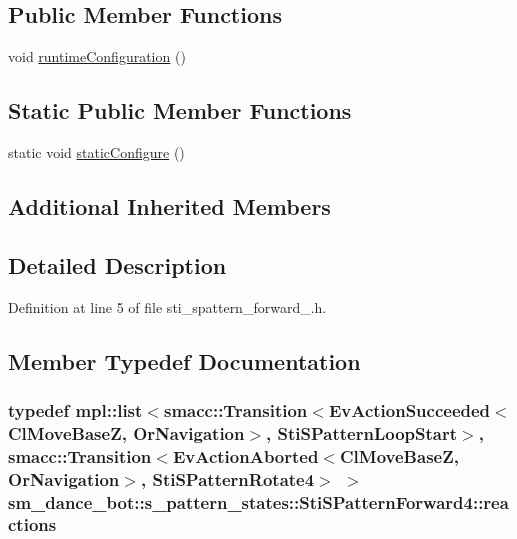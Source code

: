 \subsection*{Public Member Functions}
\begin{DoxyCompactItemize}
\item 
void \hyperlink{structsm__dance__bot_1_1s__pattern__states_1_1StiSPatternForward4_a1926043b5d5792ec4fed0e6911523268}{runtime\+Configuration} ()
\end{DoxyCompactItemize}
\subsection*{Static Public Member Functions}
\begin{DoxyCompactItemize}
\item 
static void \hyperlink{structsm__dance__bot_1_1s__pattern__states_1_1StiSPatternForward4_a387e35cd74525e1c124639f4452dbb6b}{static\+Configure} ()
\end{DoxyCompactItemize}
\subsection*{Additional Inherited Members}


\subsection{Detailed Description}


Definition at line 5 of file sti\+\_\+spattern\+\_\+forward\+\_.\+h.



\subsection{Member Typedef Documentation}
\subsubsection[{\texorpdfstring{reactions}{reactions}}]{\setlength{\rightskip}{0pt plus 5cm}typedef mpl\+::list$<${\bf smacc\+::\+Transition}$<$Ev\+Action\+Succeeded$<${\bf Cl\+Move\+BaseZ}, {\bf Or\+Navigation}$>$, {\bf Sti\+S\+Pattern\+Loop\+Start}$>$, {\bf smacc\+::\+Transition}$<$Ev\+Action\+Aborted$<${\bf Cl\+Move\+BaseZ}, {\bf Or\+Navigation}$>$, {\bf Sti\+S\+Pattern\+Rotate4}$>$ $>$ {\bf sm\+\_\+dance\+\_\+bot\+::s\+\_\+pattern\+\_\+states\+::\+Sti\+S\+Pattern\+Forward4\+::reactions}}\hypertarget{structsm__dance__bot_1_1s__pattern__states_1_1StiSPatternForward4_ad866ac6fc36bcba87f94f5357ffdd9f8}{}\label{structsm__dance__bot_1_1s__pattern__states_1_1StiSPatternForward4_ad866ac6fc36bcba87f94f5357ffdd9f8}


